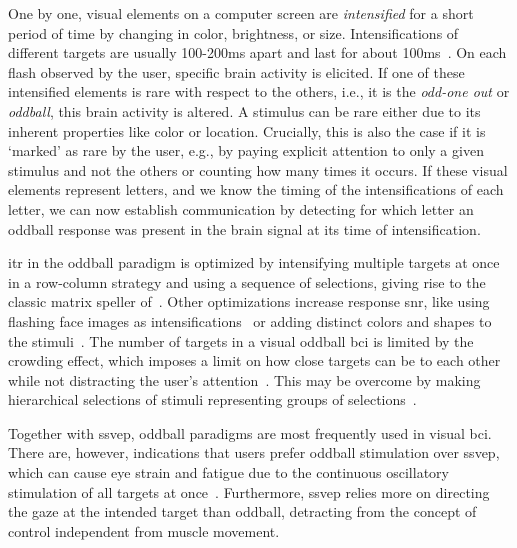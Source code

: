 One by one, visual elements on a computer screen are \emph{intensified} for a short
period of time by changing in color, brightness, or size.
Intensifications of different targets are usually 100-200ms apart and last for about
100ms~\cite{Sellers2006a}.
On each flash observed by the user, specific brain activity is elicited.
If one of these intensified elements is rare with respect to the others, i.e., it is the
\emph{odd-one out} or \emph{oddball}, this brain activity is altered.
A stimulus can be rare either due to its inherent properties like color or location.
Crucially, this is also the case if it is `marked' as rare by the user, e.g., by paying
explicit attention to only a given stimulus and not the others or counting how many
times it occurs.
If these visual elements represent letters, and we know the timing of the
intensifications of each letter, we can now establish communication by detecting for
which letter an oddball response was present in the brain signal at its time of
intensification.

\Ac{itr} in the oddball paradigm is optimized by intensifying multiple targets at once
in a row-column strategy and using a sequence of selections, giving rise to the classic
matrix speller of~\cite{Farwell1988}.
Other optimizations increase response \ac{snr}, like using flashing face images as
intensifications~\cite{Jin2012} or adding distinct colors and shapes to the
stimuli~\cite{Treder2011}.
The number of targets in a visual oddball \ac{bci} is limited by the crowding effect,
which imposes a limit on how close targets can be to each other while not distracting
the user's attention~\cite{Sellers2006a,Li2010}.
This may be overcome by making hierarchical selections of stimuli representing groups
of selections~\cite{Treder2010}.

Together with \ac{ssvep}, oddball paradigms are most frequently used in visual \ac{bci}.
There are, however, indications that users prefer oddball stimulation over \ac{ssvep},
which can cause eye strain and fatigue due to the continuous oscillatory stimulation of
all targets at once~\cite{Xu2021}.
Furthermore, \ac{ssvep} relies more on directing the gaze at the intended target than
oddball, detracting from the concept of control independent from muscle movement.

